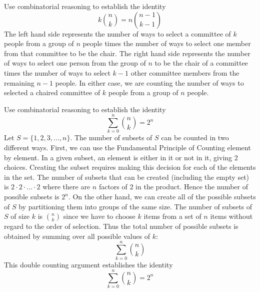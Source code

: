 \documentclass[handout]{ximera}
\begin{document}
\begin{example}[example 3]
Use combinatorial reasoning to establish the identity
\[
k \binom{n}{k} = n\binom{n-1}{k-1}
\]
The left hand side represents the number of ways to select a committee of $k$ people from a group 
of $n$ people times the number of ways to select one member from that committee to be the chair. 
The right hand side represents the number of ways to select one person from the group of $n$ to be the 
chair of a committee times the number of ways to select $k-1$ other committee members from 
the remaining $n-1$ people.  In either case, we are counting the number of ways to selected 
a chaired committee of $k$ people from a group of $n$ people.
\end{example}



\begin{example}[example 4]
Use combinatorial reasoning to establish the identity
\[
\sum_{k=0}^n \binom{n}{k} = 2^n
\]
Let $S = \{1,2,3,...,n\}$. The number of subsets of $S$ can be counted in two different ways.
First, we can use the Fundamental Principle of Counting element by element. 
In a given subset, an element is either in it or not in it, giving 2 choices. 
Creating the subset requires making this decision for each of the elements in the set. 
The number of subsets that can be created (including the empty set) 
is $2 \cdot 2 \cdot \ldots \cdot 2$ where there are $n$ factors of $2$ in the product.  
Hence the number of possible subsets is $2^n$.
On the other hand, we can create all of the possible subsets of $S$ by partitioning them 
into groups of the same size.
The number of subsets of $S$ of size $k$ is $\binom{n}{k}$ since we have to choose $k$ items from a 
set of $n$ items without regard to the order of selection. Thus the total number of possible 
subsets is obtained by summing over all possible values of $k$:
\[
\sum_{k=0}^n \binom{n}{k}
\]
This double counting argument establishes the identity
\[
\sum_{k=0}^n \binom{n}{k} = 2^n
\]

\end{example}
\end{document}
